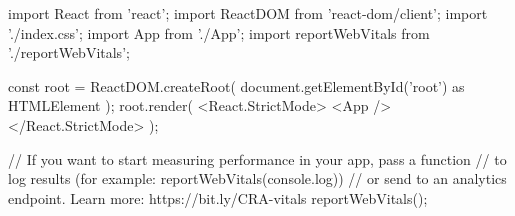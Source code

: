 import React from 'react';
import ReactDOM from 'react-dom/client';
import './index.css';
import App from './App';
import reportWebVitals from './reportWebVitals';

const root = ReactDOM.createRoot(
  document.getElementById('root') as HTMLElement
);
root.render(
  <React.StrictMode>
    <App />
  </React.StrictMode>
);

// If you want to start measuring performance in your app, pass a function
// to log results (for example: reportWebVitals(console.log))
// or send to an analytics endpoint. Learn more: https://bit.ly/CRA-vitals
reportWebVitals();